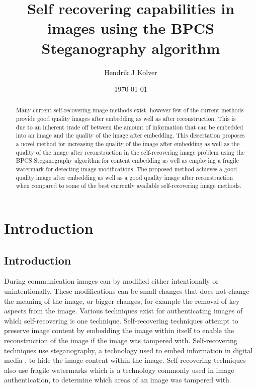 \documentclass[12pt]{article}
\title{Self recovering capabilities in images using the BPCS Steganography algorithm}
\author{Hendrik J Kolver}
\date{\today}
\begin{document}
\maketitle

\begin{abstract}

\noindent 
Many current self-recovering image methods exist, however few of the current methods provide good quality images after embedding as well as after reconstruction.
This is due to an inherent trade off between the amount of information that can be embedded into an image and the quality of the image after embedding.
This dissertation proposes a novel method for increasing the quality of the image after embedding as well as the quality of the image after reconstruction in the self-recovering image problem using the BPCS Steganography algorithm for content embedding as well as employing a fragile watermark for detecting image modifications.
The proposed method achieves a good quality image after embedding as well as a good quality image after reconstruction when compared to some of the best currently available self-recovering image methods. 

\end{abstract}

\tableofcontents
\section{Introduction}

\subsection{Introduction}
During communication images can by modified either intentionally or unintentionally.  These modifications can be small changes that does not change the meaning of the image, or bigger changes, for example the removal of key aspects from the image. 
Various techniques exist for authenticating images of which self-recovering is one technique. 
Self-recovering techniques attempt to preserve image content by embedding the image within itself to enable the reconstruction of the image if the image was tampered with. Self-recovering techniques use steganography, a technology used to embed information in digital media \cite{johnson1998exploring}, to hide the image content within the image.  Self-recovering techniques also use fragile watermarks which is a technology commonly used in image authentication, to determine which areas of an image was tampered with.
\end{document}
